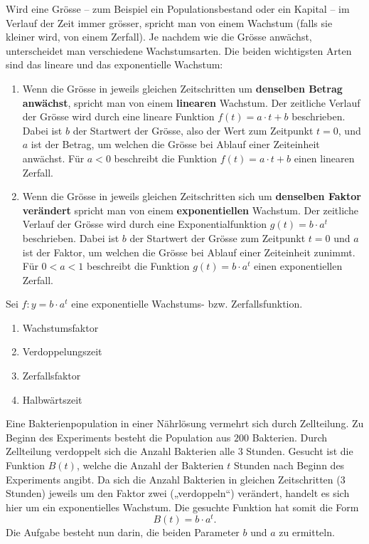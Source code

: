 \documentclass[11pt,oneside]{article}
\begin{document}
	Wird eine Grösse – zum Beispiel ein Populationsbestand oder ein Kapital – im Verlauf der Zeit immer grösser, spricht man von einem Wachstum (falls sie kleiner wird, von einem Zerfall). Je nachdem wie die Grösse anwächst, unterscheidet man verschiedene Wachstumsarten. Die beiden wichtigsten Arten sind das lineare und das exponentielle Wachstum:
	\begin{definition}
		\begin{enumerate}
			\item Wenn die Grösse in jeweils gleichen Zeitschritten um \textbf{denselben Betrag anwächst}, spricht man von einem \textbf{linearen} Wachstum. Der zeitliche Verlauf der Grösse wird durch eine lineare Funktion $f(t)=a\cdot t+b$ beschrieben. Dabei ist $b$ der Startwert der Grösse, also der Wert zum Zeitpunkt $t=0$, und $a$ ist der Betrag, um welchen die Grösse bei Ablauf einer Zeiteinheit anwächst.\newline
			Für $a<0$ beschreibt die Funktion $f(t)=a\cdot t+b$ einen linearen Zerfall.
			\item Wenn die Grösse in jeweils gleichen Zeitschritten sich um \textbf{denselben Faktor verändert} spricht man von einem \textbf{exponentiellen} Wachstum. Der zeitliche Verlauf der Grösse wird durch eine Exponentialfunktion $g(t)=b\cdot a^t$ beschrieben. Dabei ist $b$ der Startwert der Grösse zum Zeitpunkt $t=0$ und $a$ ist der Faktor, um welchen die Grösse bei Ablauf einer Zeiteinheit zunimmt.\newline
			Für $0<a<1$ beschreibt die Funktion $g(t)=b\cdot a^t$ einen exponentiellen Zerfall.
		\end{enumerate}
	\end{definition}
	\begin{notation}
		Sei $f:y=b\cdot a^t$ eine exponentielle Wachstums- bzw. Zerfallsfunktion.
		\begin{enumerate}[label=\ ]
			\item Wachstumsfaktor 
			\item Verdoppelungszeit 
			\item Zerfallsfaktor 
			\item Halbwärtszeit 
		\end{enumerate}
	\end{notation}
	\begin{beispiel}
		Eine Bakterienpopulation in einer Nährlösung vermehrt sich durch Zellteilung. Zu Beginn des Experiments besteht die Population aus $200$ Bakterien. Durch Zellteilung verdoppelt sich die Anzahl Bakterien alle $3$ Stunden. Gesucht ist die Funktion $B(t)$, welche die Anzahl der Bakterien $t$ Stunden nach Beginn des Experiments angibt.\newline
		Da sich die Anzahl Bakterien in gleichen Zeitschritten ($3$ Stunden) jeweils um den Faktor zwei („verdoppeln“) verändert, handelt es sich hier um ein exponentielles Wachstum. Die gesuchte Funktion hat somit die Form \[B(t)=b\cdot a^t.\]
		Die Aufgabe besteht nun darin, die beiden Parameter $b$ und $a$ zu ermitteln.\vspace{5pt}\newline{}
	\end{beispiel}
\end{document}
